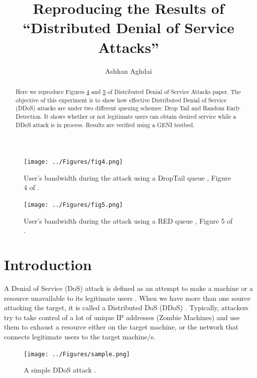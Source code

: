 \documentclass[12pt,twocolumn]{article}
\title{Reproducing the Results of\\``Distributed Denial of Service Attacks''}
\author{Ashkan Aghdai}
\begin{document}
\maketitle

\begin{abstract}

Here we reproduce Figures \hyperref[fig4]{4} and \hyperref[fig5]{5} of Distributed Denial of Service Attacks paper.
The objective of this experiment is to show how effective Distributed Denial of Service (DDoS) attacks are under two different queuing schemes: Drop Tail and Random Early Detection.
It shows whether or not legitimate users can obtain desired service while a DDoS attack is in process.
Results are verified using a GENI testbed.
\end{abstract}

\begin{figure}[b!]
    \centering
    \texttt{[image: ../Figures/fig4.png]} \caption{User's bandwidth during the attack using a DropTail queue \cite{bertsekas1992data}, Figure 4 of \cite{lau2000distributed}.} \label{fig4}
\end{figure}

\begin{figure}[b!]
    \centering
    \texttt{[image: ../Figures/fig5.png]} \caption{User's bandwidth during the attack using a RED queue \cite{floyd1993random}, Figure 5 of \cite{lau2000distributed}.} \label{fig5}
\end{figure}

\section{Introduction}

A Denial of Service (DoS) attack is defined as an attempt to make a machine or a resource unavailable to its legitimate users \cite{bellovin1989security}.
When we have more than one source attacking the target, it is called a Distributed DoS (DDoS) \cite{lau2000distributed}.
Typically, attackers try to take control of a lot of unique IP addresses (Zombie Machines) and use them to exhaust a resource either on the target machine, or the network that connects legitimate users to the target machine/s.

\begin{figure}
    \centering
    \texttt{[image: ../Figures/sample.png]} \caption{A simple DDoS attack \cite{lau2000distributed}.} \label{sampleDDoS}
\end{figure}
\end{document}
